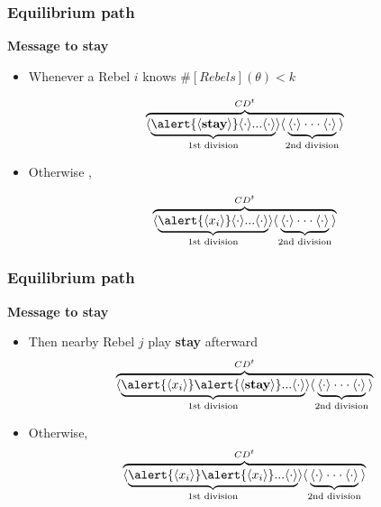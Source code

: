 \documentclass[10pt]{beamer}
\begin{document}
\begin{frame}
\frametitle{Equilibrium path}

\textbf{Message to \textbf{stay}}

\begin{itemize}
\item Whenever a Rebel $i$ knows \alert{$\#[Rebels](\theta)<k$} 

\[\overbrace{\langle\underbrace{\alert{\langle \textbf{stay} \rangle} \langle \cdot \rangle ... \langle \cdot \rangle}_{\text{1st division}}\rangle \langle\underbrace{\langle \cdot \rangle \cdot \cdot \cdot \langle \cdot \rangle}_{\text{2nd division}} \rangle }^{CD^t}\] 
\item \alert{Otherwise} ,

\[\overbrace{\langle\underbrace{\alert{\langle x_i \rangle} \langle \cdot \rangle ... \langle \cdot \rangle}_{\text{1st division}}\rangle \langle\underbrace{\langle \cdot \rangle \cdot \cdot \cdot \langle \cdot \rangle}_{\text{2nd division}} \rangle }^{CD^t}\] 

\end{itemize}

\end{frame}

\begin{frame}
\frametitle{Equilibrium path}

\textbf{Message to \textbf{stay}}

\begin{itemize}
\item Then nearby Rebel $j$ \alert{play \textbf{stay} afterward}
\[\overbrace{\langle\underbrace{\alert{\langle x_i \rangle} \alert{\langle \textbf{stay} \rangle} ... \langle \cdot \rangle}_{\text{1st division}}\rangle \langle\underbrace{\langle \cdot \rangle \cdot \cdot \cdot \langle \cdot \rangle}_{\text{2nd division}} \rangle }^{CD^t}\] 

\item \alert{Otherwise},
\[\overbrace{\langle\underbrace{\alert{\langle x_i \rangle} \alert{\langle x_i \rangle} ... \langle \cdot \rangle}_{\text{1st division}}\rangle \langle\underbrace{\langle \cdot \rangle \cdot \cdot \cdot \langle \cdot \rangle}_{\text{2nd division}} \rangle }^{CD^t}\] 

\end{itemize}

\end{frame}
\end{document}
